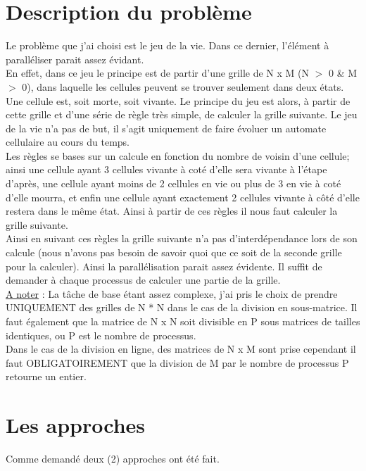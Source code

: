 \documentclass[10pt,a4paper]{article}
\begin{document}
\section{Description du problème}

\indent Le problème que j'ai choisi est le jeu de la vie. Dans ce dernier, l'élément à paralléliser parait assez évidant. \\
En effet, dans ce jeu le principe est de partir d'une grille de N x M (N $>$ 0 \& M $>$ 0), dans laquelle les cellules peuvent se trouver seulement dans deux états. Une cellule est, soit morte, soit vivante. 
Le principe du jeu est alors, à partir de cette grille et d'une série de règle très simple, de calculer la grille suivante. 
Le jeu de la vie n'a pas de but, il s'agit uniquement de faire évoluer un automate cellulaire au cours du temps.\\

Les règles se bases sur un calcule en fonction du nombre de voisin d'une cellule; ainsi une cellule ayant 3 cellules vivante à coté d'elle sera vivante à l'étape d'après, une cellule ayant moins de 2 cellules en vie ou plus de 3 en vie à coté d'elle mourra, et enfin une cellule ayant exactement 2 cellules vivante à côté d'elle restera dans le même état. Ainsi à partir de ces règles il nous faut calculer la grille suivante. \\

Ainsi en suivant ces règles la grille suivante n'a pas d'interdépendance lors de son calcule (nous n'avons pas besoin de savoir quoi que ce soit de la seconde grille pour la calculer). Ainsi la parallélisation parait assez évidente. Il suffit de demander à chaque processus de calculer une partie de la grille. \\

\underline{A noter} : La tâche de base étant assez complexe, j'ai pris le choix de prendre UNIQUEMENT des grilles de N * N dans le cas de la division en sous-matrice. Il faut également que la matrice de N x N soit divisible en P sous matrices de tailles identiques, ou P est le nombre de processus.\\
Dans le cas de la division en ligne, des matrices de N x M sont prise cependant il faut OBLIGATOIREMENT que la division de M par le nombre de processus P retourne un entier. \\
\section{Les approches}
Comme demandé deux (2) approches ont été fait. \\
\end{document}
